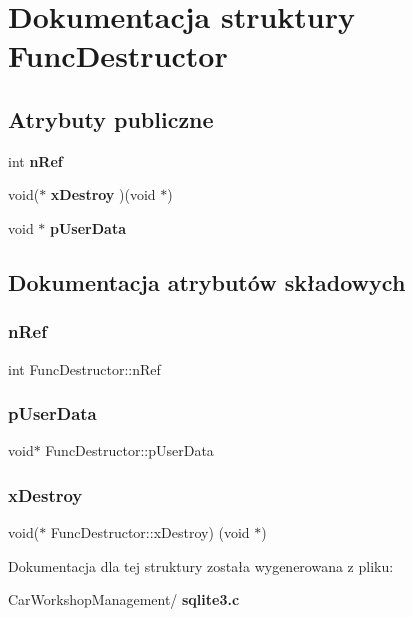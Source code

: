 \section{Dokumentacja struktury Func\+Destructor}
\label{struct_func_destructor}
\subsection*{Atrybuty publiczne}
\begin{DoxyCompactItemize}
\item 
int \textbf{ n\+Ref}
\item 
void($\ast$ \textbf{ x\+Destroy} )(void $\ast$)
\item 
void $\ast$ \textbf{ p\+User\+Data}
\end{DoxyCompactItemize}


\subsection{Dokumentacja atrybutów składowych}
\mbox{\label{struct_func_destructor_a8b1bf3af00c88400efc1dd74a4410463}} 
\subsubsection{nRef}
{\footnotesize\ttfamily int Func\+Destructor\+::n\+Ref}

\mbox{\label{struct_func_destructor_a181875609f0f8221985cd6cfd7ad8cd8}} 
\subsubsection{pUserData}
{\footnotesize\ttfamily void$\ast$ Func\+Destructor\+::p\+User\+Data}

\mbox{\label{struct_func_destructor_a53c33a1ad567b79570c783a8a65d6246}} 
\subsubsection{xDestroy}
{\footnotesize\ttfamily void($\ast$ Func\+Destructor\+::x\+Destroy) (void $\ast$)}



Dokumentacja dla tej struktury została wygenerowana z pliku\+:\begin{DoxyCompactItemize}
\item 
Car\+Workshop\+Management/\textbf{ sqlite3.\+c}\end{DoxyCompactItemize}
